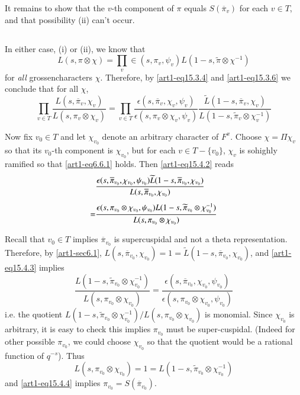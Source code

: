 It remains to show that the $v$-th component of $\pi$ equals $S(\overline{\pi}_{v})$ for each $v\in T$, and that possibility (ii) can't occur.

\subsection{}\label{art1-sec15.4}
In either case, (i) or (ii), we know that
\setcounter{equation}{0}
\begin{equation}
L(s,\pi\otimes \chi)=\prod\limits_{v}\in (s,\pi_{v},\psi_{v})L(1-s,\widetilde{\pi}\otimes \chi^{-1})\label{art1-eq15.4.1}
\end{equation}
for {\em all} grossencharacters $\chi$. Therefore, by \eqref{art1-eq15.3.4} and \eqref{art1-eq15.3.6} we conclude that for all $\chi$,
\begin{equation}
\prod\limits_{v\in T}\frac{L(s,\overline{\pi}_{v},\chi_{v})}{L(s,\pi_{v}\otimes \chi_{v})}=\prod\limits_{v\in T}\frac{\epsilon(s,\overline{\pi}_{v},\chi_{v},\psi_{v})}{\epsilon(s,\pi_{v}\otimes \chi_{v},\psi_{v})}\frac{\widetilde{L}(1-s,\overline{\pi}_{v},\chi_{v})}{L(1-s,\widetilde{\pi}_{v}\otimes \chi^{-1}_{v})}\label{art1-eq15.4.2}
\end{equation}

Now fix $v_{0}\in T$ and let $\chi_{v_{0}}$ denote an arbitrary character of $F^{x}$. Choose $\chi=\Pi \chi_{v}$ so that its $v_{0}$-th component is $\chi_{v_{0}}$, but for each $v\in T-\{v_{0}\}$, $\chi_{v}$ is so\pageoriginale highly ramified so that \eqref{art1-eq6.6.1} holds. Then \eqref{art1-eq15.4.2} reads
\begin{align}
& \frac{\epsilon(s,\overline{\pi}_{v_{0}},\chi_{v_{0}},\psi_{v_{0}})\widetilde{L}(1-s,\overline{\pi}_{v_{0}},\chi_{v_{0}})}{L(s,\overline{\pi}_{v_{0}},\chi_{v_{0}})}\label{art1-eq15.4.3}\\[4pt]
= &\dfrac{\epsilon(s,\pi_{v_{0}}\otimes \chi_{v_{0}},\psi_{v_{0}})L(1-s,\widetilde{\pi}_{v_{0}}\otimes \chi^{-1}_{v_{0}})}{L(s,\pi_{v_{0}}\otimes \chi_{v_{0}})}\notag
\end{align}

Recall that $v_{0}\in T$ implies $\overline{\pi}_{v_{0}}$ is supercuspidal and not a theta representation. Therefore, by \ref{art1-sec6.1}, $L(s,\overline{\pi}_{v_{0}},\chi_{v_{0}})=1=\widetilde{L}(1-s,\overline{\pi}_{v_{0}},\chi_{v_{0}})$, and \eqref{art1-eq15.4.3} implies
\begin{equation}
\frac{L(1-s,\widetilde{\pi}_{v_{0}}\otimes \chi_{v_{0}}^{-1})}{L(s,\pi_{v_{0}}\otimes \chi_{v_{0}})}=\dfrac{\epsilon(s,\overline{\pi}_{v_{0}},\chi_{v_{0}},\psi_{v_{0}})}{\epsilon(s,\pi_{v_{0}}\otimes \chi_{v_{0}},\psi_{v_{0}})}\label{art1-eq15.4.4}
\end{equation}
i.e. the quotient $L(1-s,\widetilde{\pi}_{v_{0}}\otimes \chi^{-1}_{v_{0}})/L(s,\pi_{v_{0}}\otimes \chi_{v_{0}})$ is monomial. Since $\chi_{v_{0}}$ is arbitrary, it is easy to check this implies $\pi_{v_{0}}$ must be super-cuspidal. (Indeed for other possible $\pi_{v_{0}}$, we could choose $\chi_{v_{0}}$ so that the quotient would be a rational function of $q^{-s}$). Thus
$$
L(s,\pi_{v_{0}}\otimes \chi_{v_{0}})=1=L(1-s,\widetilde{\pi}_{v_{0}}\otimes \chi_{v_{0}}^{-1})
$$
and \eqref{art1-eq15.4.4} implies $\pi_{v_{0}}=S(\overline{\pi}_{v_{0}})$.

